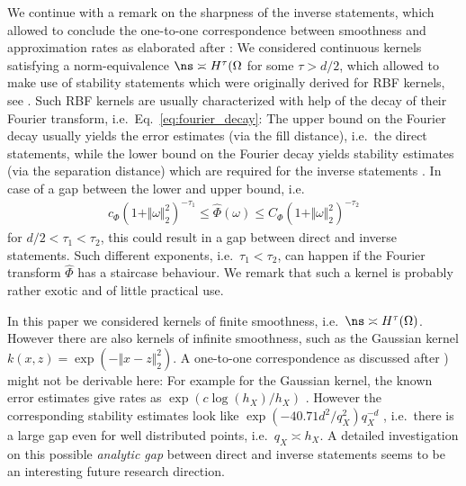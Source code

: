 \documentclass[a4paper, 10pt]{article}
\begin{document}
%
We continue with a remark on the sharpness of the inverse statements, which allowed to conclude the one-to-one correspondence between smoothness and approximation rates as elaborated after :
We considered continuous kernels satisfying a norm-equivalence $\ns \asymp H^\tau(\Omega$ for some $\tau > d/2$, 
which allowed to make use of stability statements which were originally derived for RBF kernels, see .
Such RBF kernels are usually characterized with help of the decay of their Fourier transform, i.e.\ Eq.~\eqref{eq:fourier_decay}:
The upper bound on the Fourier decay usually yields the error estimates (via the fill distance), i.e.\ the direct statements,
while the lower bound on the Fourier decay yields stability estimates (via the separation distance) which are required for the inverse statements \cite{schaback2002inverse, schaback1995error}.
In case of a gap between the lower and upper bound, i.e.
\begin{align*}
c_\Phi (1+\Vert \omega \Vert_2^2)^{-\tau_1} \leq \hat{\Phi}(\omega) \leq C_\Phi (1 + \Vert \omega \Vert_2^2)^{-\tau_2}
\end{align*}
for $d/2 < \tau_1 < \tau_2$,
this could result in a gap between direct and inverse statements.
Such different exponents, i.e.\ $\tau_1 < \tau_2$, can happen if the Fourier transform $\hat{\Phi}$ has a staircase behaviour.
We remark that such a kernel is probably rather exotic and of little practical use.

%
%

In this paper we considered kernels of finite smoothness, i.e.\ $\ns \asymp H^\tau(\Omega)$.
However there are also kernels of infinite smoothness, such as the Gaussian kernel $k(x, z) = \exp(- \Vert x - z \Vert_2^2)$.
A one-to-one correspondence as discussed after ) might not be derivable here:
For example for the Gaussian kernel, the known error estimates give rates as $\exp(c \log(h_{X}) / h_{X})$ \cite[Theorem 11.22]{wendland2005scattered}.
However the corresponding stability estimates look like $\exp(-40.71d^2/q_X^2) q_X^{-d}$ \cite[Corollary 12.4]{wendland2005scattered}, 
i.e.\ there is a large gap even for well distributed points, i.e.\ $q_X \asymp h_{X}$.
A detailed investigation on this possible \textit{analytic gap} between direct and inverse statements seems to be an interesting future research direction.


%
%

%
%
%
%
\end{document}
